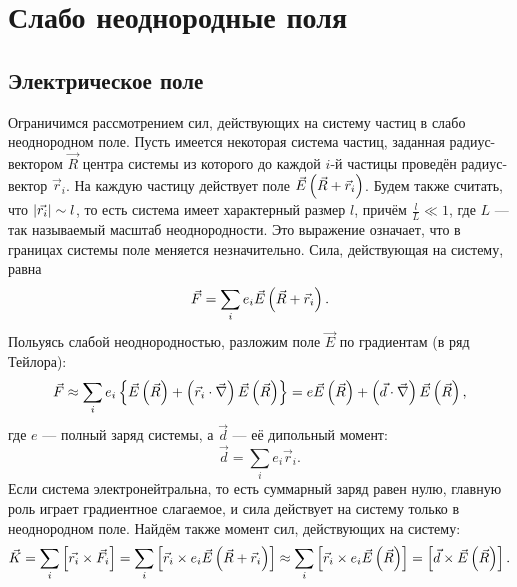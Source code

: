 \newpage
\section{Слабо неоднородные поля}
\subsection{Электрическое поле}
    Ограничимся рассмотрением сил, действующих на систему частиц в слабо неоднородном поле.
    Пусть имеется некоторая система частиц, заданная радиус-вектором $\vec{R}$ центра системы
    из которого до каждой $i$-й частицы проведён радиус-вектор $\vec{r}_i$. На каждую частицу действует поле $\vec{E}\left({\vec{R} + \vec{r}_i}\right)$.
    Будем также считать, что $\left|{\vec{r_i}}\right| \sim l$, то есть система имеет характерный размер $l$, причём $\frac lL \ll 1$, где $L$ --- так называемый
    масштаб неоднородности. Это выражение означает, что в границах системы поле меняется незначительно. Сила, действующая на систему, равна
    \[
        \vec{F} = \sum_i e_i \vec{E}\left({\vec{R} + \vec{r}_i}\right).
    \]
    Польуясь слабой неоднородностью, разложим поле $\vec{E}$ по градиентам (в ряд Тейлора):
    \[
        \vec{F} \approx \sum_i e_i \left\{{\vec{E}\left({\vec{R}}\right) + \left({\vec{r}_i \cdot \vec{\nabla}}\right)\vec{E}\left({\vec{R}}\right)}\right\} = 
        e\vec{E}\left({\vec{R}}\right) + \left({\vec{d} \cdot \vec{\nabla}}\right)\vec{E}\left({\vec{R}}\right),
    \]
    где $e$ --- полный заряд системы, а $\vec{d}$ --- её дипольный момент:
    \[
        \vec{d} = \sum_ie_i\vec{r}_i.
    \]
    Если система электронейтральна, то есть суммарный заряд равен нулю, главную роль играет градиентное слагаемое,
    и сила действует на систему только в неоднородном поле.
    Найдём также момент сил, действующих на систему:
    \[
        \vec{K} = \sum_i \left[{\vec{r_i}\times\vec{F_i}}\right] = \sum_i \left[{\vec{r}_i \times e_i\vec{E}\left({\vec{R} + \vec{r}_i}\right)}\right] \approx \sum_i \left[{\vec{r}_i \times e_i\vec{E}\left({\vec{R}}\right)}\right] =
        \left[{\vec{d} \times \vec{E}\left({\vec{R}}\right)}\right].
    \]
